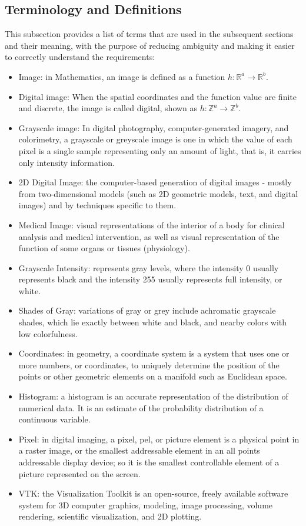 \documentclass[12pt]{article}
\begin{document}
\subsection{Terminology and  Definitions}

This subsection provides a list of terms that are used in the subsequent
sections and their meaning, with the purpose of reducing ambiguity and making it
easier to correctly understand the requirements:

\begin{itemize}

\item Image: in Mathematics, an image is defined as a function $h : \mathbb{R}^{a} \rightarrow \mathbb{R}^{b}$.
\item Digital image: When the spatial coordinates and the function value are finite and discrete, the image is called digital, shown as $h : \mathbb{Z}^{a} \rightarrow \mathbb{Z}^{b}$.
\item Grayscale image: In digital photography, computer-generated imagery, and colorimetry, a grayscale or greyscale image is one in which the value of each pixel is a single sample representing only an amount of light, that is, it carries only intensity information.
\item 2D Digital Image: the computer-based generation of digital images - mostly from two-dimensional models (such as 2D geometric models, text, and digital images) and by techniques specific to them.
\item Medical Image: visual representations of the interior of a body for clinical analysis and medical intervention, as well as visual representation of the function of some organs or tissues (physiology).
\item Grayscale Intensity: represents gray levels, where the intensity 0 usually represents black and the intensity 255 usually represents full intensity, or white.
\item Shades of Gray: variations of gray or grey include achromatic grayscale shades, which lie exactly between white and black, and nearby colors with low colorfulness.
\item Coordinates: in geometry, a coordinate system is a system that uses one or more numbers, or coordinates, to uniquely determine the position of the points or other geometric elements on a manifold such as Euclidean space.
\item Histogram: a histogram is an accurate representation of the distribution of numerical data. It is an estimate of the probability distribution of a continuous variable.
\item Pixel: in digital imaging, a pixel, pel, or picture element is a physical point in a raster image, or the smallest addressable element in an all points addressable display device; so it is the smallest controllable element of a picture represented on the screen.
\item VTK: the Visualization Toolkit is an open-source, freely available software system for 3D computer graphics, modeling, image processing, volume rendering, scientific visualization, and 2D plotting.
\end{itemize}
\end{document}
